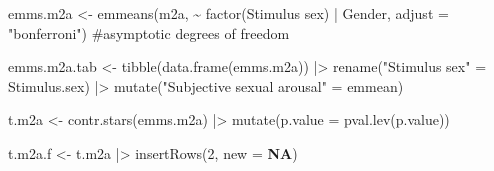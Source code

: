 \documentclass[
  bookmarksnumbered]{article}
\newenvironment{Shaded}{\begin{snugshade}}{\end{snugshade}}
\newcommand{\AttributeTok}[1]{\textcolor[rgb]{0.80,0.80,0.80}{#1}}
\newcommand{\CommentTok}[1]{\textcolor[rgb]{0.50,0.62,0.50}{#1}}
\newcommand{\ConstantTok}[1]{\textcolor[rgb]{0.86,0.64,0.64}{\textbf{#1}}}
\newcommand{\DecValTok}[1]{\textcolor[rgb]{0.86,0.86,0.80}{#1}}
\newcommand{\FunctionTok}[1]{\textcolor[rgb]{0.94,0.94,0.56}{#1}}
\newcommand{\NormalTok}[1]{\textcolor[rgb]{0.80,0.80,0.80}{#1}}
\newcommand{\OtherTok}[1]{\textcolor[rgb]{0.94,0.94,0.56}{#1}}
\newcommand{\SpecialCharTok}[1]{\textcolor[rgb]{0.86,0.64,0.64}{#1}}
\newcommand{\StringTok}[1]{\textcolor[rgb]{0.80,0.58,0.58}{#1}}
\begin{document}
\begin{Shaded}
\begin{Highlighting}[]
\NormalTok{emms.m2a }\OtherTok{\textless{}{-}} \FunctionTok{emmeans}\NormalTok{(m2a, }\SpecialCharTok{\textasciitilde{}} \FunctionTok{factor}\NormalTok{(}\StringTok{\textasciigrave{}}\AttributeTok{Stimulus sex}\StringTok{\textasciigrave{}}\NormalTok{) }\SpecialCharTok{|}\NormalTok{ Gender,}
                    \AttributeTok{adjust =} \StringTok{"bonferroni"}\NormalTok{) }\CommentTok{\#asymptotic degrees of freedom}

\NormalTok{emms.m2a.tab }\OtherTok{\textless{}{-}} \FunctionTok{tibble}\NormalTok{(}\FunctionTok{data.frame}\NormalTok{(emms.m2a)) }\SpecialCharTok{|\textgreater{}}
  \FunctionTok{rename}\NormalTok{(}\StringTok{"Stimulus sex"} \OtherTok{=}\NormalTok{ Stimulus.sex) }\SpecialCharTok{|\textgreater{}} 
  \FunctionTok{mutate}\NormalTok{(}\StringTok{"Subjective sexual arousal"} \OtherTok{=}\NormalTok{ emmean)}

\NormalTok{t.m2a }\OtherTok{\textless{}{-}} \FunctionTok{contr.stars}\NormalTok{(emms.m2a) }\SpecialCharTok{|\textgreater{}} 
  \FunctionTok{mutate}\NormalTok{(}\AttributeTok{p.value =} \FunctionTok{pval.lev}\NormalTok{(p.value))}

\NormalTok{t.m2a.f }\OtherTok{\textless{}{-}}\NormalTok{ t.m2a }\SpecialCharTok{|\textgreater{}} 
  \FunctionTok{insertRows}\NormalTok{(}\DecValTok{2}\NormalTok{, }\AttributeTok{new =} \ConstantTok{NA}\NormalTok{)}


\end{Highlighting}
\end{Shaded}
\end{document}
